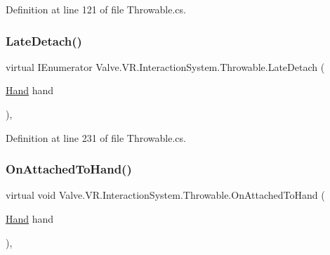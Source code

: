 Definition at line 121 of file Throwable.\+cs.

\mbox{\label{class_valve_1_1_v_r_1_1_interaction_system_1_1_throwable_a322e3327e63a7ff4de8b16882ecf7d2d}} 
\subsubsection{\texorpdfstring{LateDetach()}{LateDetach()}}
{\footnotesize\ttfamily virtual I\+Enumerator Valve.\+V\+R.\+Interaction\+System.\+Throwable.\+Late\+Detach (\begin{DoxyParamCaption}\item[{\mbox{\hyperlink{class_valve_1_1_v_r_1_1_interaction_system_1_1_hand}{Hand}}}]{hand }\end{DoxyParamCaption})\hspace{0.3cm}{\ttfamily [protected]}, {\ttfamily [virtual]}}



Definition at line 231 of file Throwable.\+cs.

\mbox{\label{class_valve_1_1_v_r_1_1_interaction_system_1_1_throwable_a2de42df50ffc477913161053600ede31}} 
\subsubsection{\texorpdfstring{OnAttachedToHand()}{OnAttachedToHand()}}
{\footnotesize\ttfamily virtual void Valve.\+V\+R.\+Interaction\+System.\+Throwable.\+On\+Attached\+To\+Hand (\begin{DoxyParamCaption}\item[{\mbox{\hyperlink{class_valve_1_1_v_r_1_1_interaction_system_1_1_hand}{Hand}}}]{hand }\end{DoxyParamCaption})\hspace{0.3cm}{\ttfamily [protected]}, {\ttfamily [virtual]}}



